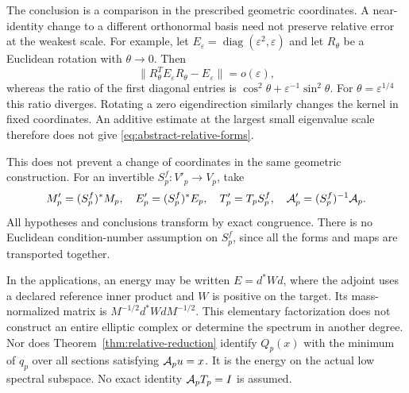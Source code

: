 The conclusion is a comparison in the prescribed geometric coordinates.
A near-identity change to a different orthonormal basis need not preserve
relative error at the weakest scale. For example, let
$E_\varepsilon=\operatorname{diag}(\varepsilon^2,\varepsilon)$ and
let $R_\theta$ be a Euclidean rotation with $\theta\to0$. Then
\[
 \|R_\theta^TE_\varepsilon R_\theta-E_\varepsilon\|
       =o(\varepsilon),
\]
whereas the ratio of the first diagonal entries is
$\cos^2\theta+\varepsilon^{-1}\sin^2\theta$. For
$\theta=\varepsilon^{1/4}$ this ratio diverges. Rotating a zero
eigendirection similarly changes the kernel in fixed coordinates.
An additive estimate at the largest small eigenvalue scale therefore does not
give \eqref{eq:abstract-relative-forms}.

This does not prevent a change of coordinates in the same geometric
construction. For an invertible $S_p^f:V'_p\to V_p$, take
\[
 M'_p=(S_p^f)^*M_p,\quad E'_p=(S_p^f)^*E_p,\quad
 T'_p=T_pS_p^f,\quad \mathcal A'_p=(S_p^f)^{-1}\mathcal A_p.
\]
All hypotheses and conclusions transform by exact congruence. There is
no Euclidean condition-number assumption on $S_p^f$, since all the
forms and maps are transported together.

In the applications, an energy may be written $E=d^*Wd$, where the
adjoint uses a declared reference inner product and $W$ is positive on
the target. Its mass-normalized matrix is
$M^{-1/2}d^*WdM^{-1/2}$. This elementary factorization does not
construct an entire elliptic complex or determine the spectrum in
another degree. Nor does Theorem~\ref{thm:relative-reduction} identify
$Q_p(x)$ with the minimum of $q_p$ over all sections satisfying
$\mathcal A_pu=x$. It is the energy on the actual low spectral subspace.
No exact identity $\mathcal A_pT_p=I$ is assumed.
